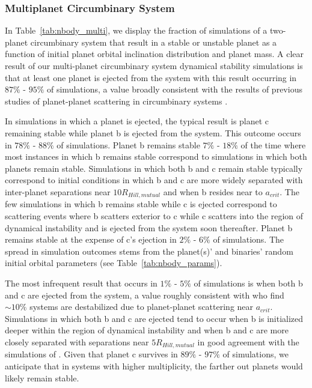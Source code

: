 \subsubsection{Multiplanet Circumbinary System}

In Table~\ref{tab:nbody_multi}, we display the fraction of simulations of a two-planet circumbinary system that result in a stable or unstable planet as a function of initial planet orbital inclination distribution and planet mass. A clear result of our multi-planet circumbinary system dynamical stability simulations is that at least one planet is ejected from the system with this result occurring in $87\%$ - $95\%$ of simulations, a value broadly consistent with the results of previous studies of planet-planet scattering in circumbinary systems \citep[e.g.][]{Sutherland2016,Smullen2016,Gong2017,Gong2017b}. 

In simulations in which a planet is ejected, the typical result is planet c remaining stable while planet b is ejected from the system.  This outcome occurs in $78\%$ - $88\%$ of simulations.  Planet b remains stable $7\%$ - $18\%$ of the time where most instances in which b remains stable correspond to simulations in which both planets remain stable.  Simulations in which both b and c remain stable typically correspond to initial conditions in which b and c are more widely separated with inter-planet separations near $10 R_{Hill,mutual}$ and when b resides near to $a_{crit}$.  The few simulations in which b remains stable while c is ejected correspond to scattering events where b scatters exterior to c while c scatters into the region of dynamical instability and is ejected from the system soon thereafter.  Planet b remains stable at the expense of c's ejection in $2\%$ - $6\%$ of simulations.  The spread in simulation outcomes stems from the planet(s)' and binaries' random initial orbital parameters (see Table~\ref{tab:nbody_params}).

The most infrequent result that occurs in $1\%$ - $5\%$ of simulations is when both b and c are ejected from the system, a value roughly consistent with \citet{Gong2017b} who find ${\sim 10\%}$ systems are destabilized due to planet-planet scattering near $a_{crit}$.  Simulations in which both b and c are ejected tend to occur when b is initialized deeper within the region of dynamical instability and when b and c are more closely separated with separations near $5 R_{Hill,mutual}$ in good agreement with the simulations of \citet{Kratter2014}.  Given that planet c survives in $89\%$ - $97\%$ of simulations, we anticipate that in systems with higher multiplicity, the farther out planets would likely remain stable.


